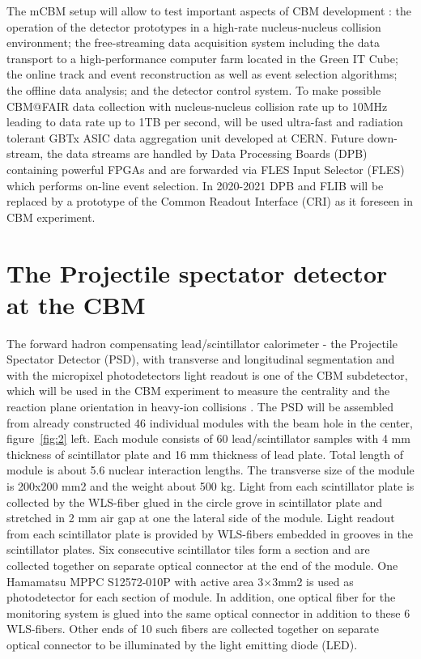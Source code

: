 \documentclass[a4paper,11pt]{article}
\begin{document}
The mCBM setup will allow to test important aspects of CBM development \cite{2}: the operation of the detector prototypes in a high-rate nucleus-nucleus collision environment; the free-streaming data acquisition system including the data transport to a high-performance computer farm located in the Green IT Cube; the online track and event reconstruction as well as event selection algorithms; the offline data analysis; and the detector control system.
To make possible CBM@FAIR data collection with nucleus-nucleus collision rate up to 10MHz leading to data rate up to 1TB per second, will be used ultra-fast and radiation tolerant GBTx ASIC data aggregation unit developed at CERN. Future down-stream, the data streams are handled by Data Processing Boards (DPB) containing powerful FPGAs and are forwarded via FLES Input Selector (FLES) which performs on-line event selection. In 2020-2021 DPB and FLIB will be replaced by a prototype of the Common Readout Interface (CRI) as it foreseen in CBM experiment.



\section{The Projectile spectator detector at the CBM}
The forward hadron compensating lead/scintillator calorimeter - the Projectile Spectator Detector (PSD), with transverse and longitudinal segmentation and with the micropixel photodetectors light readout is one of the CBM subdetector, which
will be used in the CBM experiment to measure the centrality and the reaction plane orientation in heavy-ion collisions \cite{3}. The PSD will be assembled from already constructed 46 individual modules with the beam hole in the center, figure~\ref{fig:2} left. Each module consists of 60 lead/scintillator samples with 4 mm thickness of scintillator plate and 16 mm thickness of lead plate. Total length of module is about 5.6 nuclear interaction lengths. The transverse size of the module is 200x200 mm2
and the weight about 500 kg. Light from each scintillator plate is collected by the WLS-fiber glued in the circle grove in scintillator plate and stretched in 2 mm air gap at one the lateral side of the module. Light readout from each scintillator plate is provided by WLS-fibers embedded in grooves in the scintillator plates. Six consecutive scintillator tiles form a section and are collected together on separate optical connector at the end of the module. One Hamamatsu MPPC S12572-010P with active area 3×3mm2 is used as photodetector for each section of module. In addition, one optical fiber for the monitoring system is glued into the same optical connector in addition to these 6 WLS-fibers. Other ends of 10 such fibers are collected together on separate optical connector to be illuminated by the light emitting diode (LED). 
\end{document}
